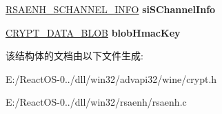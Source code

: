 \begin{DoxyCompactItemize}
\item 
\mbox{\label{structtag_c_r_y_p_t_k_e_y_a15c11b4e347887ddd74067e466d6749a}} 
\hyperlink{struct___r_s_a_e_n_h___s_c_h_a_n_n_e_l___i_n_f_o}{R\+S\+A\+E\+N\+H\+\_\+\+S\+C\+H\+A\+N\+N\+E\+L\+\_\+\+I\+N\+FO} {\bfseries si\+S\+Channel\+Info}
\item 
\mbox{\label{structtag_c_r_y_p_t_k_e_y_a1196b3210deb75d2021562b412a5777d}} 
\hyperlink{struct___c_r_y_p_t_o_a_p_i___b_l_o_b}{C\+R\+Y\+P\+T\+\_\+\+D\+A\+T\+A\+\_\+\+B\+L\+OB} {\bfseries blob\+Hmac\+Key}
\end{DoxyCompactItemize}


该结构体的文档由以下文件生成\+:\begin{DoxyCompactItemize}
\item 
E\+:/\+React\+O\+S-\/0../dll/win32/advapi32/wine/crypt.\+h\item 
E\+:/\+React\+O\+S-\/0../dll/win32/rsaenh/rsaenh.\+c\end{DoxyCompactItemize}
